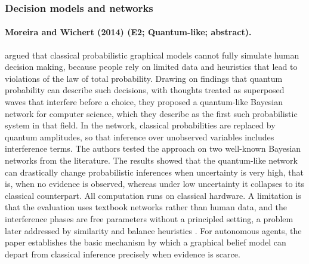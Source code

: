 \documentclass[10pt,a4paper]{article}
\begin{document}
\subsubsection*{Decision models and networks}
\paragraph{Moreira and Wichert (2014) (E2; Quantum-like; abstract).} \citet{Moreira2014} argued that classical probabilistic graphical models cannot fully simulate human decision making, because people rely on limited data and heuristics that lead to violations of the law of total probability. Drawing on findings that quantum probability can describe such decisions, with thoughts treated as superposed waves that interfere before a choice, they proposed a quantum-like Bayesian network for computer science, which they describe as the first such probabilistic system in that field. In the network, classical probabilities are replaced by quantum amplitudes, so that inference over unobserved variables includes interference terms. The authors tested the approach on two well-known Bayesian networks from the literature. The results showed that the quantum-like network can drastically change probabilistic inferences when uncertainty is very high, that is, when no evidence is observed, whereas under low uncertainty it collapses to its classical counterpart. All computation runs on classical hardware. A limitation is that the evaluation uses textbook networks rather than human data, and the interference phases are free parameters without a principled setting, a problem later addressed by similarity and balance heuristics \citep{Moreira2016,Wichert2020}. For autonomous agents, the paper establishes the basic mechanism by which a graphical belief model can depart from classical inference precisely when evidence is scarce.
\end{document}
